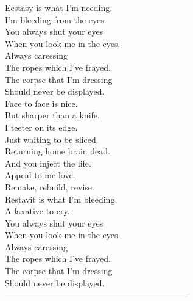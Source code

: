 Ecstasy is what I'm needing. \\
I'm bleeding from the eyes. \\
You always shut your eyes \\
When you look me in the eyes. \\

Always caressing \\
The ropes which I've frayed. \\
The corpse that I'm dressing \\
Should never be displayed. \\

Face to face is nice. \\
But sharper than a knife. \\
I teeter on its edge. \\
Just waiting to be sliced. \\
Returning home brain dead. \\
And you inject the life. \\
Appeal to me love. \\
Remake, rebuild, revise. \\

Restavit is what I'm bleeding. \\
A laxative to cry. \\
You always shut your eyes \\
When you look me in the eyes. \\

Always caressing \\
The ropes which I've frayed. \\
The corpse that I'm dressing \\
Should never be displayed. \\

-----------------------------------------------------------------



